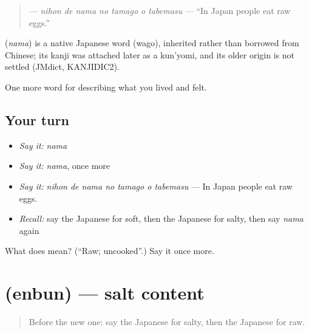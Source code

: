 \begin{quote}
\textbf{   } — \emph{nihon de nama no tamago o tabemasu} — \textquotedblleft{}In Japan people eat raw eggs.\textquotedblright{}
\end{quote}

\begin{cousinweb}
\textbf{} (\emph{nama}) is a native Japanese word (wago), inherited rather than borrowed from Chinese; its kanji was attached later as a kun'yomi, and its older origin is not settled (JMdict, KANJIDIC2).
\end{cousinweb}

\begin{grammarlens}[title={What you've built}]
One more word for describing what you lived and felt.
\end{grammarlens}

\subsection*{Your turn}
\begin{itemize}
\raggedright
  \item \emph{Say it:} \emph{nama}
  \item \emph{Say it:} \emph{nama}, once more
  \item \emph{Say it:} \emph{nihon de nama no tamago o tabemasu} — In Japan people eat raw eggs.
  \item \emph{Recall:} say the Japanese for soft, then the Japanese for salty, then say \emph{nama} again
\end{itemize}

\begin{tcolorbox}[breakable,colback=teal!4,colframe=teal!35!black,title={Before you move on}]
What does  mean? (\textquotedblleft{}Raw; uncooked\textquotedblright{}.) Say it once more.
\end{tcolorbox}
\section[\texorpdfstring{\ja{えんぶん} (enbun)}{えんぶん (enbun)}]{ (enbun) — salt content}

\label{lesson:JA-C496-enbun}



\begin{quote}
Before the new one: say the Japanese for salty, then the Japanese for raw.
\end{quote}

